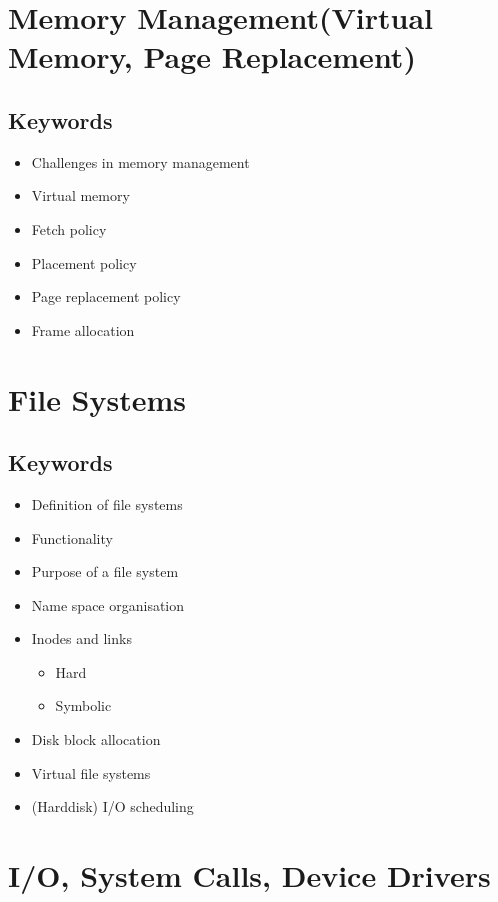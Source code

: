 \documentclass{report}
\begin{document}
\chapter{Memory Management(Virtual Memory, Page Replacement)}

\section{Keywords}
\begin{itemize}
\item Challenges in memory management
\item Virtual memory
\item Fetch policy
\item Placement policy
\item Page replacement policy
\item Frame allocation
\end{itemize}
\newpage
\chapter{File Systems}

\section{Keywords}
\begin{itemize}
\item Definition of file systems
\item Functionality
\item Purpose of a file system
\item Name space organisation
\item Inodes and links
\begin{itemize}
\item Hard
\item Symbolic
\end{itemize}
\item Disk block allocation
\item Virtual file systems
\item (Harddisk) I/O scheduling
\end{itemize}
\newpage
\chapter{I/O, System Calls, Device Drivers}
\end{document}
